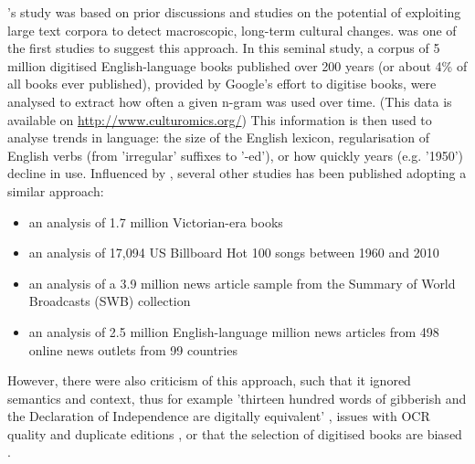 \documentclass{report}
\begin{document}
\cite{lansdall2017content}'s study was based on prior discussions and studies on the potential of exploiting large text corpora to detect macroscopic, long-term cultural changes. 
\cite{michel2011quantitative} was one of the first studies to suggest this approach.
In this seminal study, a corpus of 5 million digitised English-language books published over 200 years (or about 4\% of all books ever published), provided by Google's effort to digitise books, were analysed to extract how often a given n-gram was used over time. (This data is available on \url{http://www.culturomics.org/})
This information is then used to analyse trends in language: the size of the English lexicon, regularisation of English verbs (from 'irregular' suffixes to '-ed'), or how quickly years (e.g. '1950') decline in use.
Influenced by \cite{michel2011quantitative}, several other studies has been published adopting a similar approach: 
\begin{itemize}
	\item an analysis of 1.7 million Victorian-era books \cite{gibbs2011conversation}
	\item an analysis of 17,094 US Billboard Hot 100 songs between 1960 and 2010 \cite{mauch2015evolution}
	\item an analysis of a 3.9 million news article sample from the Summary of World Broadcasts (SWB) collection \cite{leetaru2011culturomics}
	\item an analysis of 2.5 million English-language million news articles from 498 online news outlets from 99 countries \cite{flaounas2013research}
\end{itemize}
However, there were also criticism of this approach, such that it ignored semantics and context, thus for example 'thirteen hundred words of gibberish and the Declaration of Independence are digitally equivalent' \cite{gooding2013mass}, issues with OCR quality and duplicate editions \cite{gooding2013mass}, or that the selection of digitised books are biased \cite{schwartz2011culturomics}.
\end{document}

